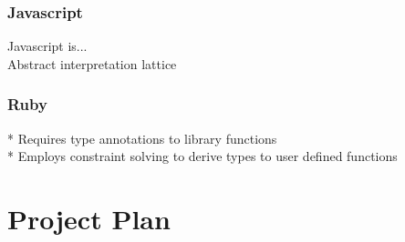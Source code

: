 \documentclass[12pt, titlepage]{article}
\begin{document}
\subsubsection*{Javascript}
Javascript is... \\
Abstract interpretation lattice \\


\subsubsection*{Ruby}
* Requires type annotations to library functions \\
* Employs constraint solving to derive types to user defined functions

\section{Project Plan}


{}

\end{document}
